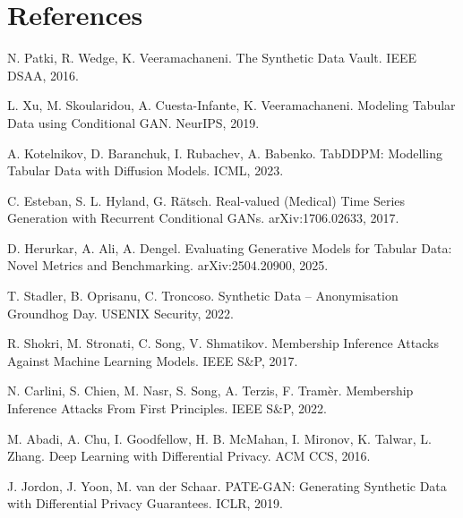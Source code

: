 \documentclass[11pt]{article}
\begin{document}
{\small
\section*{References}
\begin{enumerate}[label={[\arabic*]},leftmargin=2.2em]
\item N. Patki, R. Wedge, K. Veeramachaneni. The Synthetic Data Vault. IEEE DSAA, 2016.
\item L. Xu, M. Skoularidou, A. Cuesta-Infante, K. Veeramachaneni. Modeling Tabular Data using Conditional GAN. NeurIPS, 2019.
\item A. Kotelnikov, D. Baranchuk, I. Rubachev, A. Babenko. TabDDPM: Modelling Tabular Data with Diffusion Models. ICML, 2023.
\item C. Esteban, S. L. Hyland, G. R\"atsch. Real-valued (Medical) Time Series Generation with Recurrent Conditional GANs. arXiv:1706.02633, 2017.
\item D. Herurkar, A. Ali, A. Dengel. Evaluating Generative Models for Tabular Data: Novel Metrics and Benchmarking. arXiv:2504.20900, 2025.
\item T. Stadler, B. Oprisanu, C. Troncoso. Synthetic Data -- Anonymisation Groundhog Day. USENIX Security, 2022.
\item R. Shokri, M. Stronati, C. Song, V. Shmatikov. Membership Inference Attacks Against Machine Learning Models. IEEE S\&P, 2017.
\item N. Carlini, S. Chien, M. Nasr, S. Song, A. Terzis, F. Tram\`er. Membership Inference Attacks From First Principles. IEEE S\&P, 2022.
\item M. Abadi, A. Chu, I. Goodfellow, H. B. McMahan, I. Mironov, K. Talwar, L. Zhang. Deep Learning with Differential Privacy. ACM CCS, 2016.
\item J. Jordon, J. Yoon, M. van der Schaar. PATE-GAN: Generating Synthetic Data with Differential Privacy Guarantees. ICLR, 2019.
\end{enumerate}
}
\end{document}
